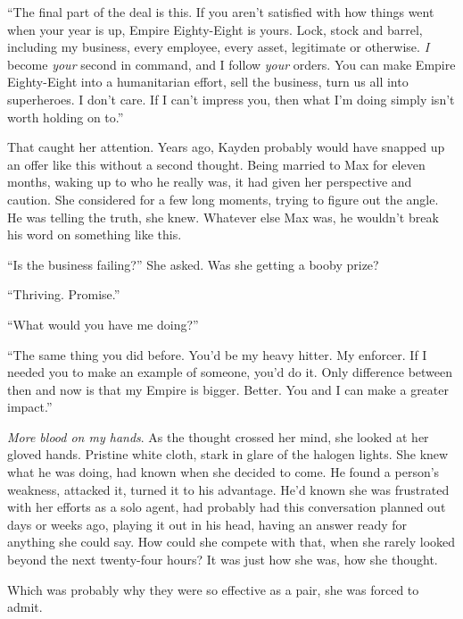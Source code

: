 ``The final part of the deal is this.  If you aren't satisfied with how things went when your year is up, Empire Eighty-Eight is yours.  Lock, stock and barrel, including my business, every employee, every asset, legitimate or otherwise.  \emph{I} become \emph{your} second in command, and I follow \emph{your} orders.  You can make Empire Eighty-Eight into a humanitarian effort, sell the business, turn us all into superheroes.  I don't care.  If I can't impress you, then what I'm doing simply isn't worth holding on to.''



That caught her attention.  Years ago, Kayden probably would have snapped up an offer like this without a second thought.  Being married to Max for eleven months, waking up to who he really was, it had given her perspective and caution.  She considered for a few long moments, trying to figure out the angle.  He was telling the truth, she knew.  Whatever else Max was, he wouldn't break his word on something like this.



``Is the business failing?''  She asked.  Was she getting a booby prize?



``Thriving.  Promise.''



``What would you have me doing?''



``The same thing you did before.  You'd be my heavy hitter.  My enforcer.  If I needed you to make an example of someone, you'd do it.  Only difference between then and now is that my Empire is bigger.  Better.  You and I can make a greater impact.''



\emph{More blood on my hands}.  As the thought crossed her mind, she looked at her gloved hands.  Pristine white cloth, stark in glare of the halogen lights.  She knew what he was doing, had known when she decided to come.  He found a person's weakness, attacked it, turned it to his advantage.  He'd known she was frustrated with her efforts as a solo agent, had probably had this conversation planned out days or weeks ago, playing it out in his head, having an answer ready for anything she could say.  How could she compete with that, when she rarely looked beyond the next twenty-four hours?  It was just how she was, how she thought.



Which was probably why they were so effective as a pair, she was forced to admit.



